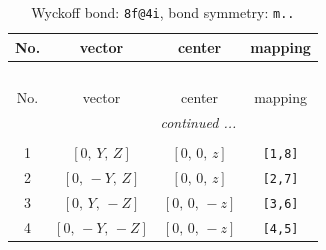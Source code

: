 \documentclass[fleqn,8pt]{jsarticle}
\begin{document}
\renewcommand{\arraystretch}{1.2}
\begin{longtable}{cccc}
\caption{Wyckoff bond: {\tt 8f@4i}, bond symmetry: {\tt m..}}
 \\
 \hline \hline
No. & vector & center & mapping \\ \hline \endfirsthead

\multicolumn{3}{l}{\tablename\ \thetable{}} \\
 \hline \hline
No. & vector & center & mapping \\ \hline \endhead

 \hline \hline
\multicolumn{3}{r}{\footnotesize\it continued ...} \\ \endfoot

 \hline \hline
\multicolumn{3}{r}{} \\ \endlastfoot

1 & $\left[ 0,\, Y,\, Z \right]$ & $\left[ 0,\, 0,\, z \right]$ & {\tt [1,8]} \\ \hline
2 & $\left[ 0,\, - Y,\, Z \right]$ & $\left[ 0,\, 0,\, z \right]$ & {\tt [2,7]} \\ \hline
3 & $\left[ 0,\, Y,\, - Z \right]$ & $\left[ 0,\, 0,\, - z \right]$ & {\tt [3,6]} \\ \hline
4 & $\left[ 0,\, - Y,\, - Z \right]$ & $\left[ 0,\, 0,\, - z \right]$ & {\tt [4,5]} \\
\end{longtable}
\renewcommand{\arraystretch}{1.2}
\end{document}

